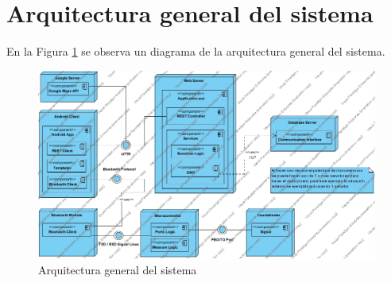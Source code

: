 \section{Arquitectura general del sistema}
En la Figura \ref{fig:arquitectura_sistema} se observa un diagrama de la arquitectura general del sistema.
\begin{figure}[H]
	\centering
	\includegraphics[scale=.44]{Capitulo4/images/arquitectura_sistema}
	\caption{Arquitectura general del sistema}
	\label{fig:arquitectura_sistema}
\end{figure}